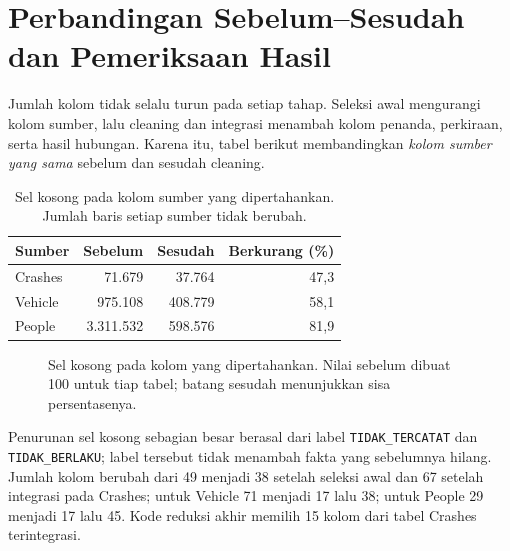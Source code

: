 \documentclass[10pt,a4paper]{article}
\begin{document}
\section{Perbandingan Sebelum--Sesudah dan Pemeriksaan Hasil}

Jumlah kolom tidak selalu turun pada setiap tahap. Seleksi awal
mengurangi kolom sumber, lalu cleaning dan integrasi menambah kolom
penanda, perkiraan, serta hasil hubungan. Karena itu, tabel berikut
membandingkan \emph{kolom sumber yang sama} sebelum dan sesudah cleaning.

\begin{table}[H]
\centering\small
\caption{Sel kosong pada kolom sumber yang dipertahankan. Jumlah baris setiap sumber tidak berubah.}
\begin{tabular}{lrrr}
\toprule
Sumber & Sebelum & Sesudah & Berkurang (\%)\\
\midrule
Crashes & 71.679 & 37.764 & 47,3\\
Vehicle & 975.108 & 408.779 & 58,1\\
People & 3.311.532 & 598.576 & 81,9\\
\bottomrule
\end{tabular}
\end{table}

\begin{figure}[H]
\centering
{}
\caption{Sel kosong pada kolom yang dipertahankan. Nilai sebelum dibuat 100 untuk tiap tabel; batang sesudah menunjukkan sisa persentasenya.}
\end{figure}

Penurunan sel kosong sebagian besar berasal dari label
\texttt{TIDAK\_TERCATAT} dan \texttt{TIDAK\_BERLAKU}; label tersebut
tidak menambah fakta yang sebelumnya hilang. Jumlah kolom berubah dari
49 menjadi 38 setelah seleksi awal dan 67 setelah integrasi pada Crashes;
untuk Vehicle 71 menjadi 17 lalu 38; untuk People 29 menjadi 17 lalu 45.
Kode reduksi akhir memilih 15 kolom dari tabel Crashes terintegrasi.
\end{document}
